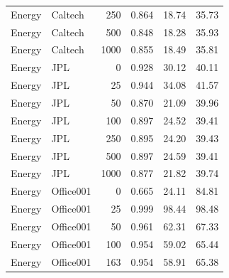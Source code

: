 {\begin{longtable}{llrrrr}
Energy & Caltech & 250 & 0.864 & 18.74 & 35.73 \\
Energy & Caltech & 500 & 0.848 & 18.28 & 35.93 \\
Energy & Caltech & 1000 & 0.855 & 18.49 & 35.81 \\
Energy & JPL & 0 & 0.928 & 30.12 & 40.11 \\
Energy & JPL & 25 & 0.944 & 34.08 & 41.57 \\
Energy & JPL & 50 & 0.870 & 21.09 & 39.96 \\
Energy & JPL & 100 & 0.897 & 24.52 & 39.41 \\
Energy & JPL & 250 & 0.895 & 24.20 & 39.43 \\
Energy & JPL & 500 & 0.897 & 24.59 & 39.41 \\
Energy & JPL & 1000 & 0.877 & 21.82 & 39.74 \\
Energy & Office001 & 0 & 0.665 & 24.11 & 84.81 \\
Energy & Office001 & 25 & 0.999 & 98.44 & 98.48 \\
Energy & Office001 & 50 & 0.961 & 62.31 & 67.33 \\
Energy & Office001 & 100 & 0.954 & 59.02 & 65.44 \\
Energy & Office001 & 163 & 0.954 & 58.91 & 65.38 \\
\end{longtable}}

